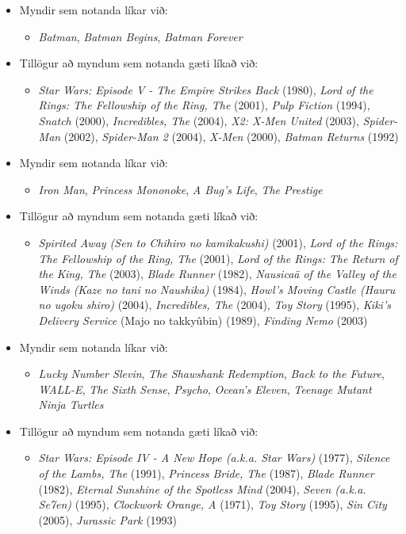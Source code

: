 \documentclass[12pt, git, draft]{rureport}
\begin{document}
\begin{itemize}
	\item Myndir sem notanda líkar við:
	\begin{itemize}
		\item \textit{Batman}, \textit{Batman Begins}, \textit{Batman Forever}
	\end{itemize}
	\item Tillögur að myndum sem notanda gæti líkað við:
	\begin{itemize}
		\item \textit{Star Wars: Episode V - The Empire Strikes Back}  (1980), \textit{Lord of the Rings: The Fellowship of the Ring, The}  (2001), \textit{Pulp Fiction}  (1994), \textit{Snatch}  (2000), \textit{Incredibles, The}  (2004), \textit{X2: X-Men United}  (2003), \textit{Spider-Man}  (2002), \textit{Spider-Man 2}  (2004), \textit{X-Men}  (2000), \textit{Batman Returns}  (1992)
	\end{itemize}
	
	\item Myndir sem notanda líkar við:
	\begin{itemize}
		\item \textit{Iron Man}, \textit{Princess Mononoke}, \textit{A Bug's Life}, \textit{The Prestige}
	\end{itemize}
	\item Tillögur að myndum sem notanda gæti líkað við:
	\begin{itemize}
		\item \textit{Spirited Away (Sen to Chihiro no kamikakushi)}  (2001), \textit{Lord of the Rings: The Fellowship of the Ring, The}  (2001), \textit{Lord of the Rings: The Return of the King, The}  (2003), \textit{Blade Runner}  (1982), \textit{Nausicaä of the Valley of the Winds (Kaze no tani no Naushika)}  (1984), \textit{Howl's Moving Castle (Hauru no ugoku shiro)}  (2004), \textit{Incredibles, The}  (2004), \textit{Toy Story}  (1995), \textit{Kiki's Delivery Service} (Majo no takkyûbin)  (1989), \textit{Finding Nemo}  (2003)
	\end{itemize}
	
	\item Myndir sem notanda líkar við:
	\begin{itemize}
		\item \textit{Lucky Number Slevin}, \textit{The Shawshank Redemption}, \textit{Back to the Future}, \textit{WALL-E}, \textit{The Sixth Sense}, \textit{Psycho}, \textit{Ocean's Eleven}, \textit{Teenage Mutant Ninja Turtles}
	\end{itemize}
	\item Tillögur að myndum sem notanda gæti líkað við:
	\begin{itemize}
		\item \textit{Star Wars: Episode IV - A New Hope (a.k.a. Star Wars)}  (1977), \textit{Silence of the Lambs, The}  (1991), \textit{Princess Bride, The}  (1987), \textit{Blade Runner}  (1982), \textit{Eternal Sunshine of the Spotless Mind}  (2004), \textit{Seven (a.k.a. Se7en)}  (1995), \textit{Clockwork Orange, A}  (1971), \textit{Toy Story}  (1995), \textit{Sin City}  (2005), \textit{Jurassic Park}  (1993)
	\end{itemize}
\end{itemize}
\end{document}
